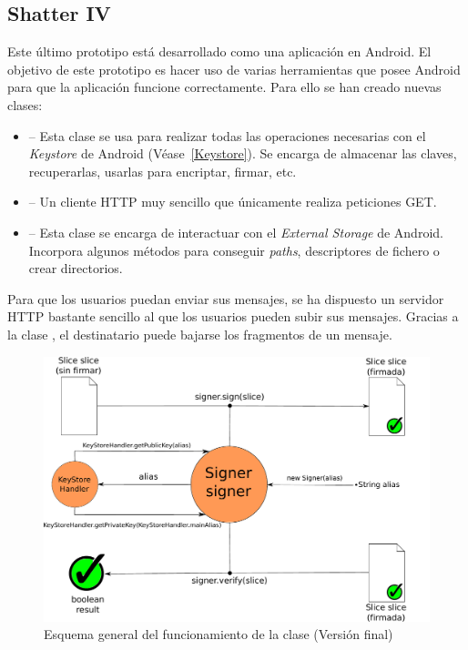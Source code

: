 \subsection{Shatter IV}

Este último prototipo está desarrollado como una aplicación en Android. El objetivo de este prototipo es hacer uso de varias herramientas que posee Android para que la aplicación funcione correctamente. Para ello se han creado nuevas clases:

\begin{itemize}
  \item {} -- Esta clase se usa para realizar todas las operaciones necesarias con el \emph{Keystore} de Android (Véase~\ref{Keystore}). Se encarga de almacenar las claves, recuperarlas, usarlas para encriptar, firmar, etc.

  \item {} -- Un cliente HTTP muy sencillo que únicamente realiza peticiones GET.

  \item {} -- Esta clase se encarga de interactuar con el \emph{External Storage} de Android. Incorpora algunos métodos para conseguir \emph{paths}, descriptores de fichero o crear directorios.
\end{itemize}

Para que los usuarios puedan enviar sus mensajes, se ha dispuesto un servidor HTTP bastante sencillo al que los usuarios pueden subir sus mensajes. Gracias a la clase , el destinatario puede bajarse los fragmentos de un mensaje.

\begin{figure}[!htb]
  \centering
  \includegraphics[scale=0.5]{Figures/Signer_2}
  \decoRule
  \caption[ (Versión final)]{Esquema general del funcionamiento de la clase  (Versión final)}
  \label{fig:Signer_2}
\end{figure}

